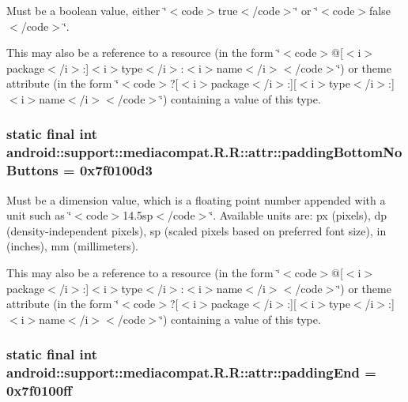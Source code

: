 Must be a boolean value, either \char`\"{}$<$code$>$true$<$/code$>$\char`\"{} or \char`\"{}$<$code$>$false$<$/code$>$\char`\"{}. 

This may also be a reference to a resource (in the form \char`\"{}$<$code$>$@\mbox{[}$<$i$>$package$<$/i$>$:\mbox{]}$<$i$>$type$<$/i$>$:$<$i$>$name$<$/i$>$$<$/code$>$\char`\"{}) or theme attribute (in the form \char`\"{}$<$code$>$?\mbox{[}$<$i$>$package$<$/i$>$:\mbox{]}\mbox{[}$<$i$>$type$<$/i$>$:\mbox{]}$<$i$>$name$<$/i$>$$<$/code$>$\char`\"{}) containing a value of this type. \hypertarget{classandroid_1_1support_1_1mediacompat_1_1_r_1_1attr_4172889e2abdc55bb4fd118c1c3e4849}{
\subsubsection[{paddingBottomNoButtons}]{\setlength{\rightskip}{0pt plus 5cm}static final int android::support::mediacompat.R.R::attr::paddingBottomNoButtons = 0x7f0100d3}}
\label{classandroid_1_1support_1_1mediacompat_1_1_r_1_1attr_4172889e2abdc55bb4fd118c1c3e4849}


Must be a dimension value, which is a floating point number appended with a unit such as \char`\"{}$<$code$>$14.5sp$<$/code$>$\char`\"{}. Available units are: px (pixels), dp (density-independent pixels), sp (scaled pixels based on preferred font size), in (inches), mm (millimeters). 

This may also be a reference to a resource (in the form \char`\"{}$<$code$>$@\mbox{[}$<$i$>$package$<$/i$>$:\mbox{]}$<$i$>$type$<$/i$>$:$<$i$>$name$<$/i$>$$<$/code$>$\char`\"{}) or theme attribute (in the form \char`\"{}$<$code$>$?\mbox{[}$<$i$>$package$<$/i$>$:\mbox{]}\mbox{[}$<$i$>$type$<$/i$>$:\mbox{]}$<$i$>$name$<$/i$>$$<$/code$>$\char`\"{}) containing a value of this type. \hypertarget{classandroid_1_1support_1_1mediacompat_1_1_r_1_1attr_426ecad19dec8def7865805e69b2c1c1}{
\subsubsection[{paddingEnd}]{\setlength{\rightskip}{0pt plus 5cm}static final int android::support::mediacompat.R.R::attr::paddingEnd = 0x7f0100ff}}
\label{classandroid_1_1support_1_1mediacompat_1_1_r_1_1attr_426ecad19dec8def7865805e69b2c1c1}


